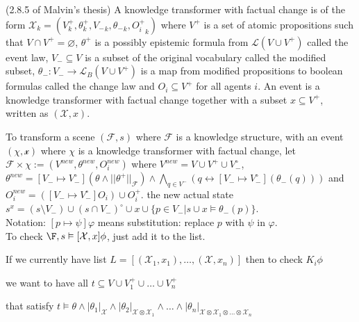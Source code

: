 \begin{defi} (2.8.5 of Malvin's thesis)
A knowledge transformer with factual change is of the form $\mathcal{X}_k = (V^+_k, \theta^+_k, {V_-}_k, {\theta_-}_k, {O_i^+}_k)$ where $V^+$ is a set of atomic propositions such that $V \cap V^+ = \varnothing$, $\theta^+$ is a possibly epistemic formula from $\mathcal{L}(V \cup V^+)$ called the event law, $V_- \subseteq V$ is a subset of the original vocabulary called the modified subset, $\theta_- : V_- \rightarrow \mathcal{L}_{B}(V \cup V^+)$ is a map from modified propositions to boolean formulas called the change law and $O_i \subseteq V^+$ for all agents $i$. An event is a knowledge transformer with factual change together with a subset $x \subseteq V^+$, written as $(\mathcal{X}, x)$. 
\end{defi}

To transform a scene $(\mathcal{F}, s)$ where $\mathcal{F}$ is a knowledge structure, with an event $(\mathcal{\chi, x})$ where $\chi$ is a knowledge transformer with factual change, let $\mathcal{F} \times \chi := (V^{new}, \theta^{new}, O^{new}_i)$ where $V^{new} = V \cup V^+ \cup V ^\circ _-$, $\theta^{new}=[V_- \mapsto V^\circ _-](\theta \land ||\theta ^+||_\mathcal{F}) \land \bigwedge_{q \in V^-}(q \leftrightarrow [V_- \mapsto V^\circ _ -](\theta_-(q)))
$ and $O^{new}_i=([V_- \mapsto V^{\circ}_-]O_i)\cup O^+ _i$. the new actual state $s^x = (s \setminus V_-) \cup (s \cap V_-)^\circ \cup x \cup \{p \in V_- | s \cup x \vDash \theta_-(p)\}$.\\

Notation: $[p \mapsto \psi] \varphi$ means substitution: replace $p$ with $\psi$ in $\varphi$.\\






To check $\F,s \vDash [\mathcal{X},x]\phi$, just add it to the list.

If we currently have list $L = [ (\mathcal{X}_1, x_1), \dots, (\mathcal{X},x_n) ]$
then to check $K_i \phi$ 

we want to have all $t \subseteq V \cup V^+_1 \cup \dots \cup V^+_n$

that satisfy $t \vDash \theta
\land |\theta_1|_\mathcal{X}
\land |\theta_2|_{\mathcal{X} \otimes \mathcal{X}_1}
\land \dots
\land |\theta_n|_{\mathcal{X} \otimes \mathcal{X}_1 \otimes \dots \otimes \mathcal{X}_n } $ 

